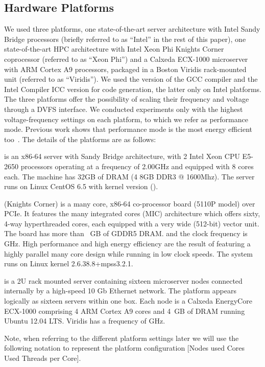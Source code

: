 \subsection{Hardware Platforms}  \label{sec:platforms:platforms}
We used three platforms, one state-of-the-art server architecture with Intel Sandy Bridge 
processors (briefly referred to as ``Intel'' in the rest of this paper),
one state-of-the-art 
HPC architecture with Intel Xeon Phi Knights Corner coprocessor 
(referred to as ``Xeon Phi'') and a Calxeda ECX-1000 microserver with 
ARM Cortex A9 processors, packaged in a Boston Viridis
rack-mounted unit (referred to as ``Viridis''). 
We used the  version of the GCC compiler and the Intel Compiler ICC 
version  
for code generation, the latter only on Intel platforms.  
The three platforms offer the possibility of 
scaling their frequency and voltage through a DVFS interface.  
We conducted experiments only with the highest voltage-frequency 
settings on each 
platform, to which we refer as performance mode. Previous work shows 
that performance mode is the most energy efficient too~\cite{Georgakoudis2014}.
The details of the platforms are as follows:
\begin{description}[leftmargin=0cm]
\item[Intel] is an x86-64 server with Sandy Bridge architecture, 
             with 2 Intel Xeon CPU E5-2650 processors 
             operating at a frequency of 2.00GHz and equipped 
             with 8 cores each. The machine has 32GB of DRAM (4  8GB DDR3 @ 1600Mhz). 
             The server runs on Linux CentOS 6.5 with kernel 
             version  ().
\item[Xeon Phi] (Knights Corner) is a many core, 
                x86-64 co-processor board (5110P model) over PCIe. 
                It features the many integrated cores (MIC) 
                architecture which offers sixty, 4-way hyperthreaded 
                cores, each equipped with a very wide (512-bit) vector 
                unit. The board has more than ~GB of GDDR5 DRAM. 
                and the clock frequency is  GHz. 
                High performance and high energy efficiency are 
                the result of featuring a highly parallel many core 
                design while running in low clock speeds.
                The system runs on Linux kernel 2.6.38.8+mpss3.2.1.
\item[Viridis]   is a 2U rack mounted server containing sixteen  
                 microserver nodes connected internally by a high-speed 10 Gb Ethernet network. 
                 The platform appears logically as sixteen servers within one box. 
                 Each node is a Calxeda EnergyCore ECX-1000 comprising 4 ARM Cortex A9 cores and 4~GB of DRAM
                 running Ubuntu 12.04 LTS. 
                 Viridis has a frequency of GHz.
\end{description}
Note, when referring to the different platform settings later we will use the 
following notation to represent the platform configuration 
[Nodes used  Cores Used  Threads per Core].
